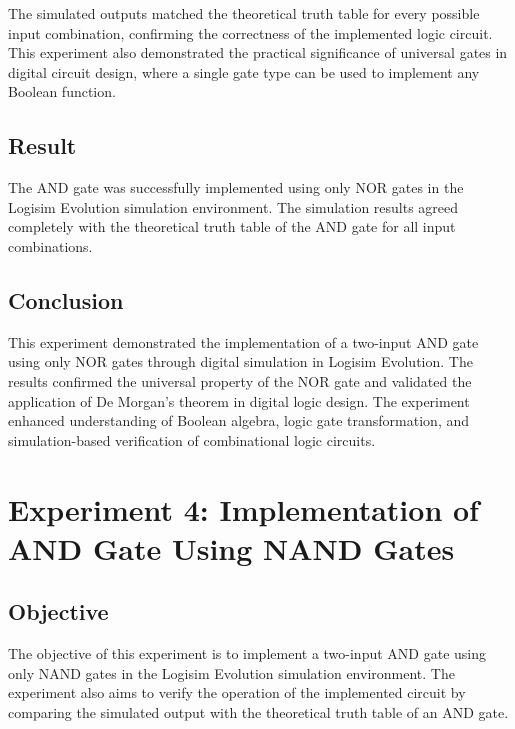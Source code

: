 \documentclass[12pt,a4paper]{article}
\begin{document}
The simulated outputs matched the theoretical truth table for every possible input combination, confirming the correctness of the implemented logic circuit. This experiment also demonstrated the practical significance of universal gates in digital circuit design, where a single gate type can be used to implement any Boolean function.

\subsection{Result}

The AND gate was successfully implemented using only NOR gates in the Logisim Evolution simulation environment. The simulation results agreed completely with the theoretical truth table of the AND gate for all input combinations.

\subsection{Conclusion}

This experiment demonstrated the implementation of a two-input AND gate using only NOR gates through digital simulation in Logisim Evolution. The results confirmed the universal property of the NOR gate and validated the application of De Morgan's theorem in digital logic design. The experiment enhanced understanding of Boolean algebra, logic gate transformation, and simulation-based verification of combinational logic circuits.


\section{Experiment 4: Implementation of AND Gate Using NAND Gates}

\subsection{Objective}

The objective of this experiment is to implement a two-input AND gate using only NAND gates in the Logisim Evolution simulation environment. The experiment also aims to verify the operation of the implemented circuit by comparing the simulated output with the theoretical truth table of an AND gate.
\end{document}
